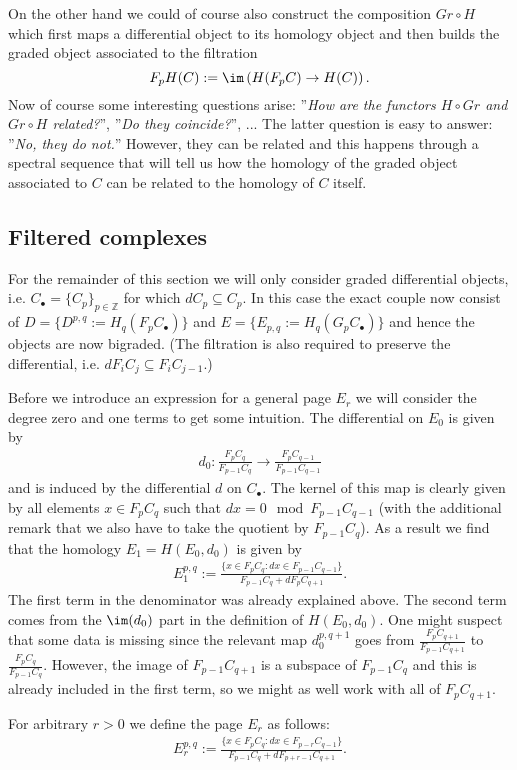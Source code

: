 	On the other hand we could of course also construct the composition $Gr\circ H$ which first maps a differential object to its homology object and then builds the graded object associated to the filtration \[F_pH(C):=\im\left(H(F_pC)\rightarrow H(C)\right).\] Now of course some interesting questions arise: ''\textit{How are the functors $H\circ Gr$ and $Gr\circ H$ related?}'', ''\textit{Do they coincide?}'', ... The latter question is easy to answer: ''\textit{No, they do not.}'' However, they can be related and this happens through a spectral sequence that will tell us how the homology of the graded object associated to $C$ can be related to the homology of $C$ itself.

\subsection{Filtered complexes}

	For the remainder of this section we will only consider graded differential objects, i.e. $C_\bullet=\{C_p\}_{p\in\mathbb{Z}}$ for which $dC_p\subseteq C_p$. In this case the exact couple now consist of $D=\{D^{p,q}:=H_q(F_pC_\bullet)\}$ and $E=\{E_{p,q}:=H_q(G_pC_\bullet)\}$ and hence the objects are now bigraded. (The filtration is also required to preserve the differential, i.e. $dF_iC_j\subseteq F_iC_{j-1}$.)


	Before we introduce an expression for a general page $E_r$ we will consider the degree zero and one terms to get some intuition. The differential on $E_0$ is given by
	\begin{gather}
		d_0:\frac{F_pC_q}{F_{p-1}C_q}\rightarrow\frac{F_pC_{q-1}}{F_{p-1}C_{q-1}}
	\end{gather}
	and is induced by the differential $d$ on $C_\bullet$. The kernel of this map is clearly given by all elements $x\in F_pC_q$ such that $dx = 0\mod F_{p-1}C_{q-1}$ (with the additional remark that we also have to take the quotient by $F_{p-1}C_q$). As a result we find that the homology $E_1=H(E_0, d_0)$ is given by
	\begin{gather}
		E_1^{p,q}:=\frac{\{x\in F_pC_q: dx\in F_{p-1}C_{q-1}\}}{F_{p-1}C_q+dF_pC_{q+1}}.
	\end{gather}
	The first term in the denominator was already explained above. The second term comes from the $\im(d_0)$ part in the definition of $H(E_0, d_0)$. One might suspect that some data is missing since the relevant map $d_0^{p, q+1}$ goes from $\frac{F_pC_{q+1}}{F_{p-1}C_{q+1}}$ to $\frac{F_pC_q}{F_{p-1}C_{q}}$. However, the image of $F_{p-1}C_{q+1}$ is a subspace of $F_{p-1}C_q$ and this is already included in the first term, so we might as well work with all of $F_pC_{q+1}$.

	For arbitrary $r>0$ we define the page $E_r$ as follows:
	\begin{gather}
	E_r^{p,q}:=\frac{\{x\in F_pC_q: dx\in F_{p-r}C_{q-1}\}}{F_{p-1}C_q+dF_{p+r-1}C_{q+1}}.
	\end{gather}
